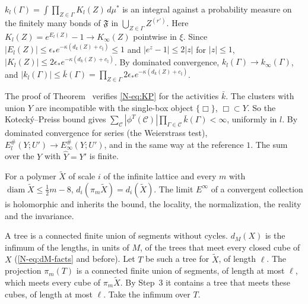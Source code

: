 \begin{step}
$k_l(\Gamma)=\int\prod_{Z\in\Gamma}K_l(Z)\,d\mu^*$ is an integral against a probability measure on the finitely many bonds of $\mathfrak F$ in $\bigcup_{Z\in\Gamma}Z^{(r')}$. Here $K_l(Z)=e^{E_l(Z)}-1\to K_\infty(Z)$ pointwise in $\xi$. Since $|E_l(Z)|\le\epsilon_*e^{-\kappa(d_k(Z)+c_\natural)}\le1$ and $|e^z-1|\le2|z|$ for $|z|\le1$, $|K_l(Z)|\le2\epsilon_*e^{-\kappa(d_k(Z)+c_\natural)}$. By dominated convergence, $k_l(\Gamma)\to k_\infty(\Gamma)$, and $|k_l(\Gamma)|\le\bar k(\Gamma)=\prod_{Z\in\Gamma}2\epsilon_*e^{-\kappa(d_k(Z)+c_\natural)}$.

The proof of Theorem~ verifies \eqref{N-eq:KP} for the activities $\bar k$. The clusters with union $Y$ are incompatible with the single-box object $\{\Box\}$, $\Box\subset Y$. So the Kotecký--Preiss bound gives $\sum_{\mathcal C}|\phi^T(\mathcal C)|\prod_{\Gamma\in\mathcal C}\bar k(\Gamma)<\infty$, uniformly in $l$. By dominated convergence for series (the Weierstrass test), $E^\#_l(Y;U')\to E^\#_\infty(Y;U')$, and in the same way at the reference $1$. The sum over the $Y$ with $\hat Y=Y'$ is finite.
\end{step}

\begin{detail}\label{d11b:gl-limits-a}
For a polymer $\tilde X$ of scale $i$ of the infinite lattice and every $m$ with $\operatorname{diam}\tilde X\le\frac12m-8$, $d_i(\pi_m\tilde X)=d_i(\tilde X)$. The limit $E^\infty$ of a convergent collection is holomorphic and inherits the bound, the locality, the normalization, the reality and the invariance.
\end{detail}

\begin{step}
A tree is a connected finite union of segments without cycles. $d_M(X)$ is the infimum of the lengths, in units of $M$, of the trees that meet every closed cube of $X$ (\eqref{N-eq:dM-facts} and before). Let $T$ be such a tree for $\tilde X$, of length $\ell$. The projection $\pi_m(T)$ is a connected finite union of segments, of length at most $\ell$, which meets every cube of $\pi_m\tilde X$. By Step~3 it contains a tree that meets these cubes, of length at most $\ell$. Take the infimum over $T$.
\end{step}

